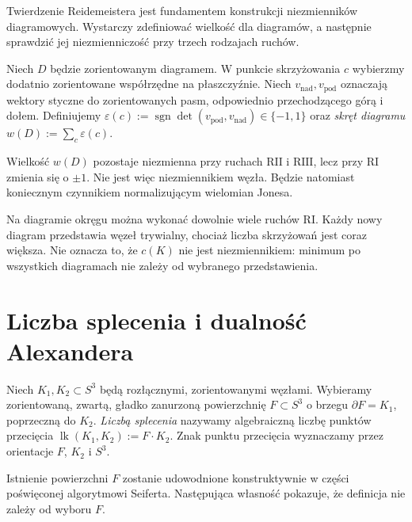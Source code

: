 Twierdzenie Reidemeistera jest fundamentem konstrukcji niezmienników
diagramowych. Wystarczy zdefiniować wielkość dla diagramów, a następnie
sprawdzić jej niezmienniczość przy trzech rodzajach ruchów.

\begin{definicja}
Niech $D$ będzie zorientowanym diagramem. W punkcie skrzyżowania
$c$ wybierzmy dodatnio zorientowane współrzędne na płaszczyźnie.
Niech $v_{\mathrm{nad}},v_{\mathrm{pod}}$ oznaczają wektory styczne
do zorientowanych pasm, odpowiednio przechodzącego górą i dołem.
Definiujemy $\varepsilon(c):=\operatorname{sgn}\det(v_{\mathrm{pod}},v_{\mathrm{nad}})
\in\{-1,1\}$ oraz \emph{skręt diagramu}
$w(D):=\sum_{c}\varepsilon(c)$.
\end{definicja}

Wielkość $w(D)$ pozostaje niezmienna przy ruchach $\mathrm{R II}$
i $\mathrm{R III}$, lecz przy $\mathrm{R I}$ zmienia się o $\pm1$.
Nie jest więc niezmiennikiem węzła. Będzie natomiast koniecznym
czynnikiem normalizującym wielomian Jonesa.

\begin{przyklad}
Na diagramie okręgu można wykonać dowolnie wiele ruchów $\mathrm{R I}$.
Każdy nowy diagram przedstawia węzeł trywialny, chociaż liczba
skrzyżowań jest coraz większa. Nie oznacza to, że $c(K)$ nie jest
niezmiennikiem: minimum po wszystkich diagramach nie zależy od
wybranego przedstawienia.
\end{przyklad}

\section{Liczba splecenia i dualność Alexandera}
\label{sec:kt-linking}

\begin{definicja}
Niech $K_1,K_2\subset S^3$ będą rozłącznymi, zorientowanymi węzłami.
Wybieramy zorientowaną, zwartą, gładko zanurzoną powierzchnię
$F\subset S^3$ o brzegu $\partial F=K_1$, poprzeczną do $K_2$.
\emph{Liczbą splecenia} nazywamy algebraiczną liczbę punktów
przecięcia $\operatorname{lk}(K_1,K_2):=F\cdot K_2$.
Znak punktu przecięcia wyznaczamy przez orientacje $F$, $K_2$ i $S^3$.
\end{definicja}

Istnienie powierzchni $F$ zostanie udowodnione konstruktywnie
w części poświęconej algorytmowi Seiferta. Następująca własność
pokazuje, że definicja nie zależy od wyboru $F$.

